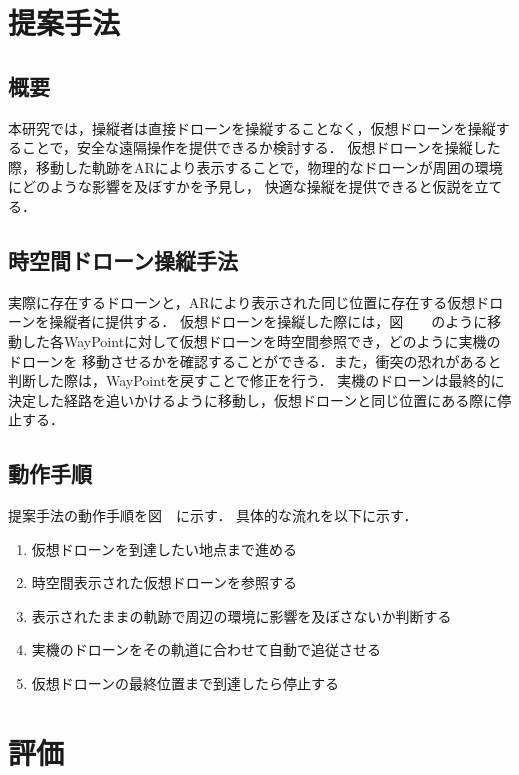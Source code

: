 \documentclass[a4paper,10pt,twocolumn,uplatex]{jsarticle}
\begin{document}

\section{提案手法}\label{discussion}
\subsection{概要}
本研究では，操縦者は直接ドローンを操縦することなく，仮想ドローンを操縦することで，安全な遠隔操作を提供できるか検討する．
仮想ドローンを操縦した際，移動した軌跡をARにより表示することで，物理的なドローンが周囲の環境にどのような影響を及ぼすかを予見し，
快適な操縦を提供できると仮説を立てる．


\subsection{時空間ドローン操縦手法}
実際に存在するドローンと，ARにより表示された同じ位置に存在する仮想ドローンを操縦者に提供する．
仮想ドローンを操縦した際には，図　　のように移動した各WayPointに対して仮想ドローンを時空間参照でき，どのように実機のドローンを
移動させるかを確認することができる．また，衝突の恐れがあると判断した際は，WayPointを戻すことで修正を行う．
実機のドローンは最終的に決定した経路を追いかけるように移動し，仮想ドローンと同じ位置にある際に停止する．



\subsection{動作手順}
提案手法の動作手順を図　に示す．
具体的な流れを以下に示す．
\begin{enumerate}
  \item 仮想ドローンを到達したい地点まで進める
  \item 時空間表示された仮想ドローンを参照する
  \item 表示されたままの軌跡で周辺の環境に影響を及ぼさないか判断する
  \item 実機のドローンをその軌道に合わせて自動で追従させる
  \item 仮想ドローンの最終位置まで到達したら停止する
\end{enumerate}



\section{評価}\label{experiment}
\end{document}
